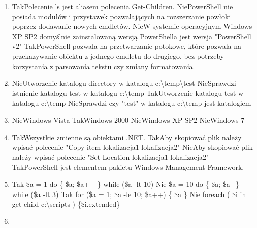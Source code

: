 \begin{enumerate}
		{Nie}{remove-item}%
		{Tak}{test-path}%
		{Nie}{path}%
		{Nie}{mew-item}
		\item {}%
		{Tak}{Polecenie ls jest aliasem polecenia Get-Children.}%
		{Nie}{PowerShell nie posiada modułów i przystawek pozwalających na rozszerzanie powłoki poprzez dodawanie nowych cmdletów.}%
		{Nie}{W systemie operacyjnym Windows XP SP2 domyślnie zainstalowaną wersją PowerShella jest wersja "PowerShell v2"}%
		{Tak}{PowerShell pozwala na przetwarzanie potokowe, które pozwala na przekazywanie obiektu z jednego cmdletu do drugiego, bez potrzeby korzystania z parsowania tekstu czy zmiany formatowania.}
		\newpage
		\item {}%
		{Nie}{Utworzenie katalogu directory w katalogu c:\textbackslash temp\textbackslash test}%
		{Nie}{Sprawdzi istnienie katalogu test w katalogu c:\textbackslash temp}%
		{Tak}{Utworzenie katalogu test w katalogu c:\textbackslash temp}%
		{Nie}{Sprawdzi czy "test" w katalogu c:\textbackslash temp jest katalogiem}
		\item {}%
		{Nie}{Windows Vista}%
		{Tak}{Windows 2000}%
		{Nie}{Windows XP SP2}%
		{Nie}{Windows 7}
		\item {}%
		{Tak}{Wszystkie zmienne są obiektami .NET.}%
		{Tak}{Aby skopiować plik należy wpisać polecenie "Copy-item lokalizacja1 lokalizacja2"}%
		{Nie}{Aby skopiować plik należy wpisać polecenie "Set-Location lokalizacja1 lokalizacja2"}%
		{Tak}{PowerShell jest elementem pakietu Windows Management Framework.}
		\item {}%
		{Tak}{ \$a = 1 do \{ \$a; \$a++ \} while (\$a -lt 10) }%
		{Nie}{ \$a = 10 do \{ \$a; \$a-- \} while (\$a -lt 3) }%
		{Tak}{ for (\$a = 1; \$a -le 10; \$a++) \{ \$a \} }%
		{Nie}{ foreach ( \$i in get-child c:\textbackslash scripts ) \{\$i.extended\} }
		\item {}
\end{enumerate}
